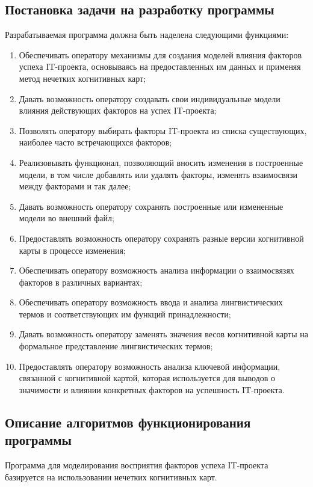 \documentclass{article}
\begin{document}
    \subsection {Постановка задачи на разработку программы}
    Разрабатываемая программа должна быть наделена следующими функциями:
    \begin{enumerate}
        \item  Обеспечивать оператору механизмы для создания моделей влияния факторов успеха IT-проекта, основываясь на предоставленных им данных и применяя метод нечетких когнитивных карт;
        \item  Давать возможность оператору создавать свои индивидуальные модели влияния действующих факторов на успех IT-проекта;
        \item  Позволять оператору выбирать факторы IT-проекта из списка существующих, наиболее часто встречающихся факторов;
        \item  Реализовывать функционал, позволяющий вносить изменения в построенные модели, в том числе добавлять или удалять факторы, изменять взаимосвязи между факторами и так далее;
        \item  Давать возможность оператору сохранять построенные или измененные модели во внешний файл;
        \item  Предоставлять возможность оператору сохранять разные версии когнитивной карты в процессе изменения;
        \item  Обеспечивать оператору возможность анализа информации о взаимосвязях факторов в различных вариантах;
        \item  Обеспечивать оператору возможность ввода и анализа лингвистических термов и соответствующих им функций принадлежности;
        \item  Давать возможность оператору заменять значения весов когнитивной карты на формальное представление лингвистических термов;
        \item  Предоставлять оператору возможность анализа ключевой информации, связанной с когнитивной картой, которая используется для выводов о значимости и влиянии конкретных факторов на успешность IT-проекта.
    \end{enumerate}

    \subsection{Описание алгоритмов функционирования программы}
    Программа для моделирования восприятия факторов успеха IT-проекта базируется на использовании нечетких когнитивных карт.
\end{document}
